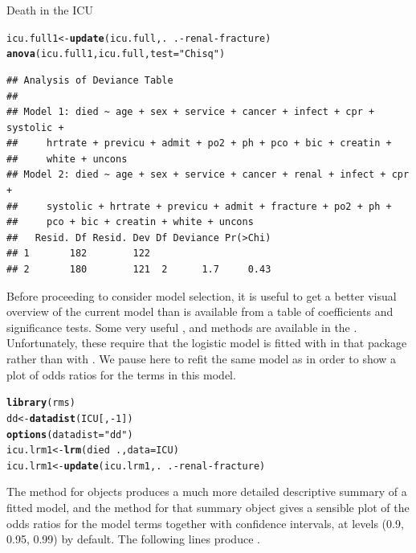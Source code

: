 \documentclass[11pt]{book}\usepackage[]{graphicx}\usepackage[]{color}
\makeatletter
\newcommand{\hlnum}[1]{\textcolor[rgb]{0.686,0.059,0.569}{#1}}%
\newcommand{\hlstr}[1]{\textcolor[rgb]{0.192,0.494,0.8}{#1}}%
\newcommand{\hlopt}[1]{\textcolor[rgb]{0,0,0}{#1}}%
\newcommand{\hlstd}[1]{\textcolor[rgb]{0.345,0.345,0.345}{#1}}%
\newcommand{\hlkwb}[1]{\textcolor[rgb]{0.69,0.353,0.396}{#1}}%
\newcommand{\hlkwc}[1]{\textcolor[rgb]{0.333,0.667,0.333}{#1}}%
\newcommand{\hlkwd}[1]{\textcolor[rgb]{0.737,0.353,0.396}{\textbf{#1}}}%
\newenvironment{kframe}{%
 \def\at@end@of@kframe{}%
 \ifinner\ifhmode%
  \def\at@end@of@kframe{\end{minipage}}%
  \begin{minipage}{\columnwidth}%
 \fi\fi%
 \def\FrameCommand##1{\hskip\@totalleftmargin \hskip-\fboxsep
 \colorbox{shadecolor}{##1}\hskip-\fboxsep
     \hskip-\linewidth \hskip-\@totalleftmargin \hskip\columnwidth}%
 \MakeFramed {\advance\hsize-\width
   \@totalleftmargin\z@ \linewidth\hsize
   \@setminipage}}%
 {\par\unskip\endMakeFramed%
 \at@end@of@kframe}
\newenvironment{knitrout}{}{} %
\renewenvironment{knitrout}{\small\renewcommand{\baselinestretch}{.85}}{} %
\makeatother
\begin{document}
\begin{Example}[icu1]{Death in the ICU}
\begin{knitrout}\footnotesize
{}\color{fgcolor}\begin{kframe}
\begin{alltt}
\hlstd{icu.full1} \hlkwb{<-} \hlkwd{update}\hlstd{(icu.full, .} \hlopt{~} \hlstd{.} \hlopt{-} \hlstd{renal} \hlopt{-} \hlstd{fracture)}
\hlkwd{anova}\hlstd{(icu.full1, icu.full,} \hlkwc{test}\hlstd{=}\hlstr{"Chisq"}\hlstd{)}
\end{alltt}
\begin{verbatim}
## Analysis of Deviance Table
## 
## Model 1: died ~ age + sex + service + cancer + infect + cpr + systolic + 
##     hrtrate + previcu + admit + po2 + ph + pco + bic + creatin + 
##     white + uncons
## Model 2: died ~ age + sex + service + cancer + renal + infect + cpr + 
##     systolic + hrtrate + previcu + admit + fracture + po2 + ph + 
##     pco + bic + creatin + white + uncons
##   Resid. Df Resid. Dev Df Deviance Pr(>Chi)
## 1       182        122                     
## 2       180        121  2      1.7     0.43
\end{verbatim}
\end{kframe}
\end{knitrout}

Before proceeding to consider model selection, it is useful to get a better
visual overview of the current model than is available from a table
of coefficients and significance tests.  
Some very useful ,  and 
methods are available in the .
Unfortunately, these require that the logistic model is 
fitted with  in that package rather than with .
We pause here to refit the same model as  in order to
show a plot of odds ratios for the terms in this model.

\begin{knitrout}
\color{fgcolor}\begin{kframe}
\begin{alltt}
\hlkwd{library}\hlstd{(rms)}
\hlstd{dd} \hlkwb{<-} \hlkwd{datadist}\hlstd{(ICU[,}\hlopt{-}\hlnum{1}\hlstd{])}
\hlkwd{options}\hlstd{(}\hlkwc{datadist}\hlstd{=}\hlstr{"dd"}\hlstd{)}
\hlstd{icu.lrm1} \hlkwb{<-} \hlkwd{lrm}\hlstd{(died} \hlopt{~} \hlstd{.,} \hlkwc{data}\hlstd{=ICU)}
\hlstd{icu.lrm1} \hlkwb{<-} \hlkwd{update}\hlstd{(icu.lrm1, .} \hlopt{~} \hlstd{.} \hlopt{-} \hlstd{renal} \hlopt{-} \hlstd{fracture)}
\end{alltt}
\end{kframe}
\end{knitrout}
The  method for  objects produces a much more detailed
descriptive summary of a fitted model, and the  method for that summary object
gives a sensible plot of the odds ratios for the model terms together with confidence
intervals, at levels (0.9, 0.95, 0.99) by default.  The following lines produce
.


\end{Example}
\end{document}
